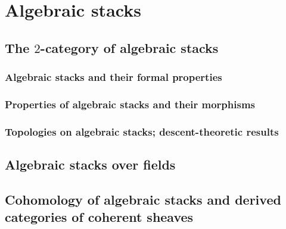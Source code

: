 \section{Algebraic stacks}
    \subsection{The \texorpdfstring{$2$}{}-category of algebraic stacks}
        \subsubsection{Algebraic stacks and their formal properties}
    
        \subsubsection{Properties of algebraic stacks and their morphisms}
        
        \subsubsection{Topologies on algebraic stacks; descent-theoretic results}
    
    \subsection{Algebraic stacks over fields}

    \subsection{Cohomology of algebraic stacks and derived categories of coherent sheaves}